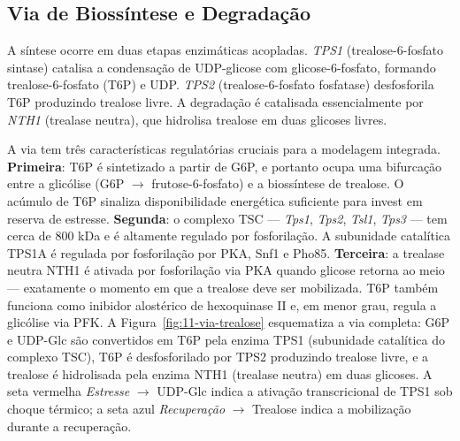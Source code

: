 \subsection{Via de Biossíntese e Degradação}
\label{sub:image11-via}

A síntese ocorre em duas etapas enzimáticas acopladas. \textit{TPS1}
(trealose-6-fosfato sintase) catalisa a condensação de UDP-glicose com
glicose-6-fosfato, formando trealose-6-fosfato (T6P) e UDP. \textit{TPS2}
(trealose-6-fosfato fosfatase) desfosforila T6P produzindo trealose livre.
A degradação é catalisada essencialmente por \textit{NTH1} (trealase
neutra), que hidrolisa trealose em duas glicoses livres.

A via tem três características regulatórias cruciais para a modelagem
integrada. \textbf{Primeira}: T6P é sintetizado a partir de G6P, e portanto
ocupa uma bifurcação entre a glicólise (G6P $\to$ frutose-6-fosfato) e a
biossíntese de trealose. O acúmulo de T6P sinaliza disponibilidade
energética suficiente para invest em reserva de estresse. \textbf{Segunda}:
o complexo TSC --- \textit{Tps1}, \textit{Tps2}, \textit{Tsl1}, \textit{Tps3}
--- tem cerca de 800 kDa e é altamente regulado por fosforilação. A
subunidade catalítica TPS1A é regulada por fosforilação por PKA, Snf1 e
Pho85. \textbf{Terceira}: a trealase neutra NTH1 é ativada por fosforilação
via PKA quando glicose retorna ao meio --- exatamente o momento em que a
trealose deve ser mobilizada. T6P também funciona como inibidor alostérico
de hexoquinase II e, em menor grau, regula a glicólise via PFK. A
Figura~\ref{fig:11-via-trealose} esquematiza a via completa: G6P e
UDP-Glc são convertidos em T6P pela enzima TPS1 (subunidade catalítica
do complexo TSC), T6P é desfosforilado por TPS2 produzindo trealose
livre, e a trealose é hidrolisada pela enzima NTH1 (trealase neutra) em
duas glicoses. A seta vermelha \emph{Estresse} $\to$ UDP-Glc indica a
ativação transcricional de TPS1 sob choque térmico; a seta azul
\emph{Recuperação} $\to$ Trealose indica a mobilização durante a
recuperação.

